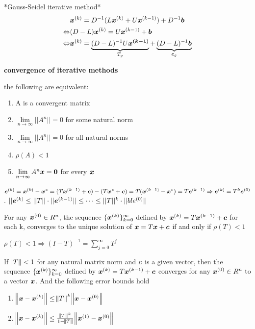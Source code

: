 \documentclass[11pt]{article}
\begin{document}
*Gauss-Seidel iterative method*
\begin{align*}
&\boldsymbol{x}^{(k)}=D^{-1}(L\boldsymbol{x}^{(k)}+U\boldsymbol{x}^{(k-1)})+D^{-1}\boldsymbol{b}\\
\Leftrightarrow&(D-L)\boldsymbol{x}^{(k)}=U\boldsymbol{x}^{(k-1)}+\boldsymbol{b}\\
\Leftrightarrow&\boldsymbol{x}^{(k)}=\underbrace{(D-L)^{-1}U\boldsymbol{x^{(k-1)}}}_{T_g}
+\underbrace{(D-L)^{-1}\boldsymbol{b}}_{\boldsymbol{c}_g}
\end{align*}


\textbf{convergence of iterative methods}
\begin{theorem}
the following are equivalent:
\begin{enumerate}
\item A is a convergent matrix
\item $\lim\limits_{n\to\infty}||A^n|| = 0$ for some natural norm
\item $\lim\limits_{n\to\infty}||A^n||=0$ for all natural norms
\item $\rho(A)<1$
\item $\lim\limits_{n\to\infty}A^n\boldsymbol{x}=\boldsymbol{0}$ for every $\boldsymbol{x}$
\end{enumerate}
\end{theorem}

\(\boldsymbol{e}^{(k)}=\boldsymbol{x}^{(k)}-\boldsymbol{x}^*=(T\boldsymbol{x}^{(k-1)}+\boldsymbol{c})-(T\boldsymbol{x}^*+\boldsymbol{c})
   =T(\boldsymbol{x}^{(k-1)}-\boldsymbol{x}^*)=T\boldsymbol{e}^{(k-1)}\Rightarrow\boldsymbol{e}^{(k)}=T^k\boldsymbol{e}^{(0)}\).
\(||\boldsymbol{e}^{(k)}\le||T||\cdot||\boldsymbol{e}^{(k-1)}||\le\dots\le||T||^k\cdot||bl{e}^{(0)}||\)

\begin{theorem}
For any $\boldsymbol{x}^{(0)}\in R^n$, the sequence $\{\boldsymbol{x}^{(k)}\}_{k=0}^\infty$
defined by $\boldsymbol{x}^{(k)}=T\boldsymbol{x}^{(k-1)}+\boldsymbol{c}$ for each k, converges to the
unique solution of $\boldsymbol{x}=T\boldsymbol{x}+\boldsymbol{c}$ if and only if $\rho(T)<1$
\end{theorem}
\(\rho(T)<1\Longrightarrow(I-T)^{-1}=\displaystyle\sum_{j=0}^\infty T^j\)

\begin{theorem}
If $\norm{T}<1$ for any natural matrix norm and $\boldsymbol{c}$ is a given vector, then the
sequence $\{\boldsymbol{x}^{(k)}\}_{k=0}^\infty$ defined by $\boldsymbol{x}^{(k)}=T\boldsymbol{x}^{(k-1)}+\boldsymbol{c}$
converges for any $\boldsymbol{x}^{(0)}\in R^n$ to a vector $\boldsymbol{x}$. And the following
error bounds hold
\begin{enumerate}
\item $\norm{\boldsymbol{x}-\boldsymbol{x}^{(k)}}\le\norm{T}^k\norm{\boldsymbol{x}-\boldsymbol{x}^{(0)}}$
\item $\norm{\boldsymbol{x}-\boldsymbol{x}^{(k)}}\le\frac{\norm{T}^k}{1-\norm{T}}\norm{\boldsymbol{x}^{(1)}
-\boldsymbol{x}^{(0)}}$
\end{enumerate}
\end{theorem}
\end{document}
